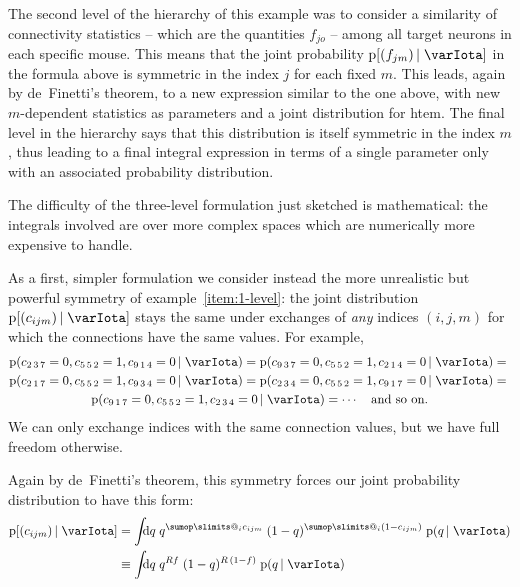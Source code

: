 \documentclass[\ifafour a4paper,12pt,\else a5paper,10pt,\fi%
onecolumn,oneside,article,%
british%
]{memoir}
\makeatletter
\theoremstyle{remark}
\theoremstyle{innote}
\def\sum{\DOTSI\sumop\slimits@}
\newcommand*{\di}{\mathrm{d}}%
\newcommand*{\pf}{\mathrm{p}}%
\renewcommand*{\|}[1][]{\nonscript\,#1\vert\nonscript\;\mathopen{}}
\newcommand*{\yI}{\varIota}
\newcommand*{\yc}{c}
\makeatother
\begin{document}
The second level of the hierarchy of this example was to consider a
similarity of connectivity statistics -- which are the quantities $f_{jo}$
-- among all target neurons in each specific mouse. This means that the
joint probability $\pf[(f_{jm}) \| \yI]$ in the formula above is symmetric
in the index $j$ for each fixed $m$. This leads, again by de~Finetti's
theorem, to a new expression similar to the one above, with new
$m$-dependent statistics as parameters and a joint distribution for htem.
The final level in the hierarchy says that this distribution is itself
symmetric in the index $m$, thus leading to a final integral expression in
terms of a single parameter only with an associated probability
distribution.

\bigskip

The difficulty of the three-level formulation just sketched is
mathematical: the integrals involved are over more complex spaces which are
numerically more expensive to handle.

As a first, simpler formulation we consider instead the more unrealistic
but powerful symmetry of example~\ref{item:1-level}: the joint distribution
$\pf[(\yc_{ijm}) \| \yI]$ stays the same under exchanges of \emph{any}
indices $(i,j,m)$ for which the connections have the same values. For example,
\begin{multline}
  \label{eq:example_exchange_i}
  \pf(\yc_{2\,3\,7}=0, \yc_{5\,5\,2}=1, \yc_{9\,1\,4}=0 \| \yI) =
  \pf(\yc_{9\,3\,7}=0, \yc_{5\,5\,2}=1, \yc_{2\,1\,4}=0 \| \yI) ={}\\
  \pf(\yc_{2\,1\,7}=0, \yc_{5\,5\,2}=1, \yc_{9\,3\,4}=0 \| \yI) =
  \pf(\yc_{2\,3\,4}=0, \yc_{5\,5\,2}=1, \yc_{9\,1\,7}=0 \| \yI) ={}\\
  \pf(\yc_{9\,1\,7}=0, \yc_{5\,5\,2}=1, \yc_{2\,3\,4}=0 \| \yI) =
  \dotsb\quad\text{and so on.}
\end{multline}
We can only exchange indices with the same connection values, but
we have full freedom otherwise.

Again by de~Finetti's theorem, this symmetry forces our joint probability
distribution to have this form:
\begin{equation}
  \label{eq:definetti_1level}
  \begin{split}
  \pf[(\yc_{ijm}) \| \yI] &=
  \int\!\!\!\di q\;
  q^{\sum_{i}\yc_{ijm}}\;(1-q)^{\sum_{i}(1-\yc_{ijm})}\;
  \pf(q \| \yI)
\\ &\equiv
  \int\!\!\!\di q\;
  q^{R f}\;(1-q)^{R\,(1-f)}\;
  \pf(q \| \yI)
\end{split}
\end{equation}
\end{document}
